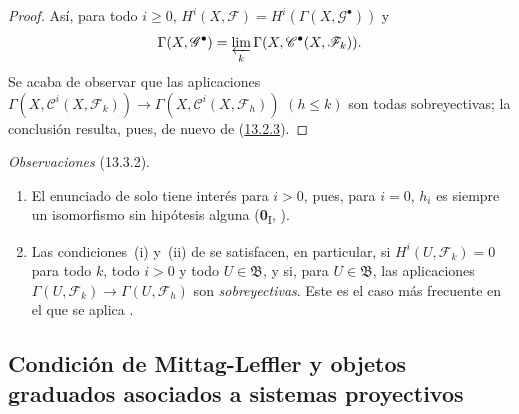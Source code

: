 \begin{proof}
Así, para todo $i\geq0$, $H^i(X,\mathcal F)=H^i(\Gamma(X,\mathcal G^\bullet))$ y \[
\Gamma(X,\mathcal G^\bullet)
=\varprojlim_k\Gamma(X,\mathcal C^\bullet(X,\mathcal F_k)).
\] Se acaba de observar que las aplicaciones $\Gamma(X,\mathcal C^i(X,\mathcal F_k))\to
\Gamma(X,\mathcal C^i(X,\mathcal F_h))$ $(h\leq k)$ son todas sobreyectivas; la conclusión resulta, pues, de nuevo de (\hyperref[0.13.2.3-fr]{13.2.3}).
\end{proof}

\begin{env}[13.3.2]
\label{0.13.3.2}
\label{0.13.3.2-fr}
\emph{Observaciones} (13.3.2).
\begin{enumerate}
  \item[{\rm(i)}]
  El enunciado de  solo tiene interés para $i>0$,
  pues, para $i=0$, $h_i$ es siempre un isomorfismo sin hipótesis
  alguna (\textbf{0}\textsubscript{I}, ).

  \item[{\rm(ii)}]
  Las condiciones~{\rm(i)} y~{\rm(ii)} de  se satisfacen,
  en particular, si
  $H^i(U,\mathcal F_k)=0$ para todo $k$, todo $i>0$ y todo
  $U\in\mathfrak B$, y si, para $U\in\mathfrak B$, las aplicaciones
  $\Gamma(U,\mathcal F_k)\to\Gamma(U,\mathcal F_h)$
  son \emph{sobreyectivas}. Este es el caso más frecuente en el que se aplica
  .
\end{enumerate}
\end{env}

\subsection{Condición de Mittag-Leffler y objetos graduados asociados a sistemas proyectivos}
\label{subsection:0.13.4}
\label{subsection:0.13.4-fr}
\label{0.13.4}
\label{0.13.4-fr}

